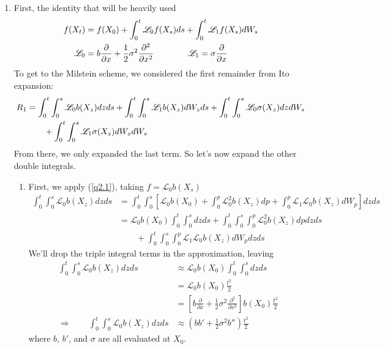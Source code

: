 \documentclass[12pt]{article}
\theoremstyle{plain}
\theoremstyle{definition}
\theoremstyle{remark}
\begin{document}
\begin{enumerate}
\begin{enumerate}
    \end{enumerate}

  \clearpage
  \item %
    First, the identity that will be heavily used
    \begin{align}
      f(X_t) &= f(X_0) + \int^t_0 \mathscr{L}_0 f(X_s) ds
      +\int^t_0 \mathscr{L}_1 f(X_s) dW_s
      \label{q2.1}\\
      \mathscr{L}_0
        &= b\frac{\partial}{\partial x}
          +\frac{1}{2}\sigma^2\frac{\partial^2}{\partial x^2}
        \qquad\qquad
      \mathscr{L}_1 = \sigma \frac{\partial}{\partial x}
      \notag
    \end{align}
    To get to the Milstein scheme, we considered the first remainder
    from Ito expansion:
    \begin{align}
      \label{q2.2}
      R_1
      &=
      \int^t_0 \int^s_0 \mathscr{L}_0b(X_z) dz ds
      +\int^t_0 \int^s_0 \mathscr{L}_1 b(X_z) dW_z ds
      +\int^t_0 \int^s_0 \mathscr{L}_0 \sigma(X_z) dz dW_s\\
      &\qquad
      +\int^t_0 \int^s_0 \mathscr{L}_1 \sigma(X_z) dW_z dW_s
      \notag
    \end{align}
    From there, we only expanded the last term.  So let's now expand the
    other double integrals.
    \begin{enumerate}
      \item First, we apply (\ref{q2.1}), taking $f=\mathscr{L}_0b(X_s)$
        \begin{align*}
          \int^t_0 \int^s_0 \mathscr{L}_0b(X_z) dz ds
          &=
          \int^t_0 \int^s_0 \left[
            \mathscr{L}_0b(X_0)
            + \int^p_0 \mathscr{L}_0^2b(X_z) dp
            + \int^p_0 \mathscr{L}_1\mathscr{L}_0b(X_z) dW_p
            \right] dz ds \\
          &=
          \mathscr{L}_0b(X_0)
            \int^t_0 \int^s_0 dz ds
            + \int^t_0 \int^s_0\int^p_0 \mathscr{L}_0^2b(X_z) dp dz ds\\
          &\qquad
            + \int^t_0 \int^s_0\int^p_0
              \mathscr{L}_1\mathscr{L}_0b(X_z) dW_p dz ds
        \end{align*}
        We'll drop the triple integral terms in the approximation,
        leaving
        \begin{align*}
          \int^t_0 \int^s_0 \mathscr{L}_0b(X_z) dz ds
          &\approx
          \mathscr{L}_0b(X_0) \int^t_0 \int^s_0 dz ds\\
          &=
          \mathscr{L}_0b(X_0) \frac{t^2}{2}\\
          &=
          \left[ b\frac{\partial}{\partial x} + \frac{1}{2}\sigma^2
          \frac{\partial^2}{\partial x^2}\right]
            b(X_0) \frac{t^2}{2}\\
          \Rightarrow \qquad
          \int^t_0 \int^s_0 \mathscr{L}_0b(X_z) dz ds
            &\approx \left( bb' + \frac{1}{2}\sigma^2 b''\right)
            \frac{t^2}{2}
        \end{align*}
        where $b$, $b'$, and $\sigma$ are all evaluated at $X_0$.


\end{enumerate}
\end{enumerate}
\end{document}
